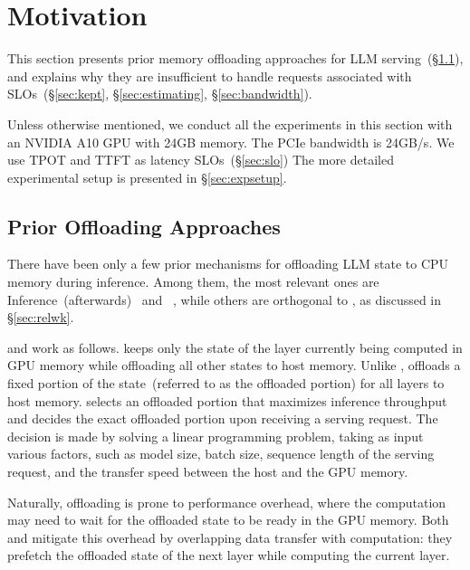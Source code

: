 \section{Motivation}

This section presents prior memory offloading approaches for LLM serving~(\S\ref{sec:prior}), 
and explains why they are insufficient to handle requests associated with SLOs~(\S\ref{sec:kept}, 
\S\ref{sec:estimating}, \S\ref{sec:bandwidth}). 

Unless otherwise mentioned, we conduct all the experiments in this section 
with an NVIDIA A10 GPU with 24GB memory.  
%
The PCIe bandwidth is 24GB/s.
%
We use TPOT and TTFT as latency SLOs~(\S\ref{sec:slo})
%
The more detailed experimental setup is presented in \S\ref{sec:expsetup}. 


\subsection{Prior Offloading Approaches}
\label{sec:prior}
% 
There have been only a few prior mechanisms for
offloading LLM state to CPU memory during inference.
%
Among them, the most relevant ones are \deepspeed Inference~(\deepspeed afterwards)~\cite{zero-infer} and \flexgen~\cite{flexgen}, 
while others are orthogonal to \sys, as discussed in \S\ref{sec:relwk}. 
%

%
\deepspeed and \flexgen work as follows. 
%
\deepspeed keeps only the state of the layer currently being computed in GPU memory while offloading all other states to host memory. 
%
Unlike \deepspeed, \flexgen offloads a fixed portion of the state~(referred to as the offloaded portion) for all layers to host memory. 
%
\flexgen selects an offloaded portion that maximizes inference throughput and decides the exact offloaded portion upon receiving a serving request. 
%
The decision is made by solving a linear programming problem, taking as input various factors, such as model size, batch size, sequence length of the serving request, and the transfer speed between the host and the GPU memory.
%

Naturally, offloading is prone to performance overhead, where the computation 
may need to wait for the offloaded state to be ready in the GPU memory. 
%
Both \deepspeed and \flexgen mitigate this overhead by overlapping data transfer with computation: they prefetch the offloaded state of the next layer while computing the current layer. 

